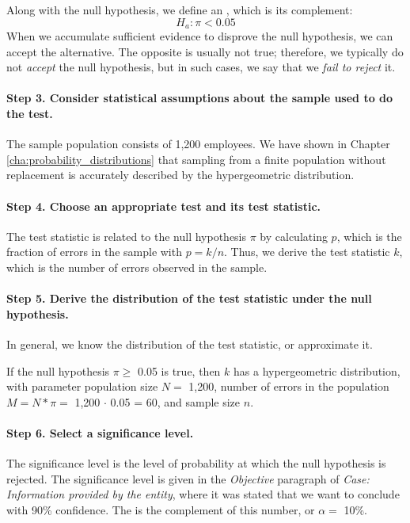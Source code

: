 Along with the null hypothesis, we define an , which is its complement:
\begin{equation*}
H_a : \pi < 0.05
\end{equation*}
When we accumulate sufficient evidence to disprove the null hypothesis, we can accept the alternative. The opposite is usually not true; therefore, we typically do not \emph{accept} the null hypothesis, but in such cases, we say that we \emph{fail to reject} it.

\paragraph{Step 3. Consider statistical assumptions about the sample used to do the test.} The sample population consists of 1,200 employees. We have shown in Chapter \ref{cha:probability_distributions} that sampling from a finite population without replacement is accurately described by the hypergeometric distribution.

\paragraph{Step 4. Choose an appropriate test and its test statistic.} The test statistic is related to the null hypothesis $\pi$ by calculating $p$, which is the fraction of errors in the sample with $p = k / n$. Thus, we derive the test statistic $k$, which is the number of errors observed in the sample.

\paragraph{Step 5. Derive the distribution of the test statistic under the null hypothesis.} In general, we know the distribution of the test statistic, or approximate it.

If the null hypothesis $\pi \geq$ 0.05 is true, then $k$ has a hypergeometric distribution, with parameter population size $N =$ 1,200, number of errors in the population $M = N * \pi = $ 1,200 $\cdot$ 0.05 = 60, and sample size $n$.

\paragraph{Step 6. Select a significance level.} The significance level is the level of probability at which the null hypothesis is rejected. The significance level is given in the \emph{Objective} paragraph of \emph{Case: Information provided by the entity}, where it was stated that we want to conclude with 90\% confidence. The  is the complement of this number, or $\alpha =$ 10\%.

